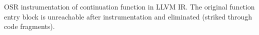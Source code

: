 \label{fig:isordascto} OSR instrumentation of continuation function in LLVM IR. The original function entry block is unreachable after instrumentation and eliminated (striked through code fragments).
